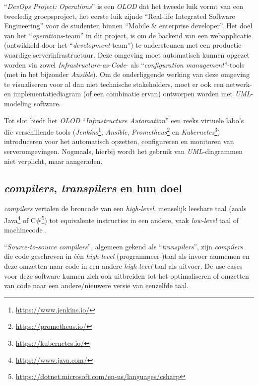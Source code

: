 ``\emph{DevOps Project: Operations}'' is een \emph{OLOD} dat het tweede luik vormt van een tweeledig groepsproject, het eerste luik zijnde ``Real-life Integrated Software Engineering'' voor de studenten binnen ``Mobile \& enterprise developer''. Het doel van het ``\emph{operations}-team'' in dit project, is om de backend van een webapplicatie (ontwikkeld door het ``\emph{development}-team'') te ondersteunen met een productie-waardige serverinfrastructuur. Deze omgeving moet automatisch kunnen opgezet worden via zowel \emph{Infrastructure-as-Code}- als ``\emph{configuration management}''-tools (met in het bijzonder \emph{Ansible}). %
Om de onderliggende werking van deze omgeving te visualiseren voor al dan niet technische stakeholders, moet er ook een netwerk- en implementatiediagram (of een combinatie ervan) ontworpen worden met \emph{UML}-modeling software.

Tot slot biedt het \emph{OLOD} ``\emph{Infrastructure Automation}'' een reeks virtuele labo's die verschillende tools (\emph{Jenkins}\footnote{\url{https://www.jenkins.io/}}, \emph{Ansible}, \emph{Prometheus}\footnote{\url{https://prometheus.io/}} en \emph{Kubernetes}\footnote{\url{https://kubernetes.io/}}) introduceren voor het automatisch opzetten, configureren en monitoren van serveromgevingen.
Nogmaals, hierbij wordt het gebruik van \emph{UML}-diagrammen niet verplicht, maar aangeraden.

\subsection{\emph{compilers}, \emph{transpilers} en hun doel}%
\label{subsec:voorstel_overzicht_transpilers}

\emph{compilers} vertalen de broncode van een \emph{high-level}, menselijk leesbare taal (zoals Java\footnote{\url{https://www.java.com/}} of C\#\footnote{\url{https://dotnet.microsoft.com/en-us/languages/csharp}}) tot equivalente instructies in een andere, vaak \emph{low-level} taal of machinecode \autocite{Seidl2012}.

``\emph{Source-to-source compilers}'', algemeen gekend als ``\emph{transpilers}'', zijn \emph{compilers} die code geschreven in één \emph{high-level} (programmeer-)taal als invoer aannemen en deze omzetten naar code in een andere \emph{high-level} taal als uitvoer. De use cases voor deze software kunnen zich ook uitbreiden tot het optimaliseren of omzetten van code naar een andere/nieuwere versie van eenzelfde taal. \autocite{Ilyushin2016}

